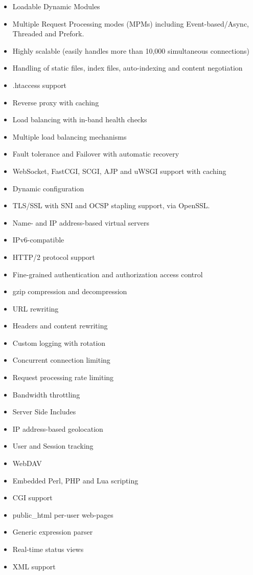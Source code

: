 \begin{enumerate}
    \begin{itemize}
        \item Loadable Dynamic Modules
        \item Multiple Request Processing modes (MPMs) including Event-based/Async, Threaded and Prefork.
        \item Highly scalable (easily handles more than 10,000 simultaneous connections)
        \item Handling of static files, index files, auto-indexing and content negotiation
        \item .htaccess support
        \item Reverse proxy with caching
        \item Load balancing with in-band health checks
        \item Multiple load balancing mechanisms
        \item Fault tolerance and Failover with automatic recovery
        \item WebSocket, FastCGI, SCGI, AJP and uWSGI support with caching
        \item Dynamic configuration
        \item TLS/SSL with SNI and OCSP stapling support, via OpenSSL.
        \item Name- and IP address-based virtual servers
        \item IPv6-compatible
        \item HTTP/2 protocol support
        \item Fine-grained authentication and authorization access control
        \item gzip compression and decompression
        \item URL rewriting
        \item Headers and content rewriting
        \item Custom logging with rotation
        \item Concurrent connection limiting
        \item Request processing rate limiting
        \item Bandwidth throttling
        \item Server Side Includes
        \item IP address-based geolocation
        \item User and Session tracking
        \item WebDAV
        \item Embedded Perl, PHP and Lua scripting
        \item CGI support
        \item public\_html per-user web-pages
        \item Generic expression parser
        \item Real-time status views
        \item XML support
    \end{itemize}
    
\end{enumerate}
